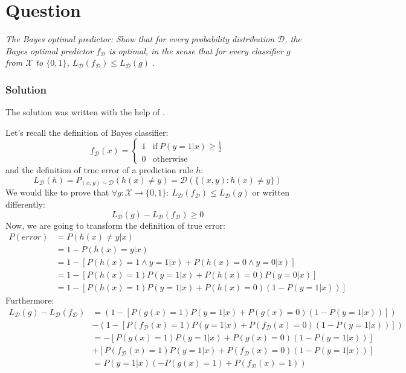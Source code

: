 \documentclass{article}
\newcounter{counterquestion}
\newenvironment{question}[1]
{
\stepcounter{counterquestion}
\section*{Question \thecounterquestion}
\textit{#1} 
} 
{
}
\newenvironment{solution}
{
\subsubsection*{Solution}
} 
{
}
\begin{document}
\begin{question}{The Bayes optimal predictor: Show that for every probability distribution $\mathcal{D}$, the Bayes optimal predictor $f_{\mathcal{D}}$ is optimal, in the sense that for every classifier $g$ from $\mathcal{X}$ to $\{0,1\}$, $L_{\mathcal{D}}(f_{\mathcal{D}}) \leq L_{\mathcal{D}}(g)$}.
\begin{solution}
The solution was written with the help of \cite{nowak}.

Let's recall the definition of Bayes classifier:
\[
f_{\mathcal{D}}(x) = 
\begin{cases}
1 & \text{if}\ P(y = 1 | x) \geq \frac{1}{2} \\
0 & \text{otherwise}
\end{cases}
\]
and the definition of true error of a prediction rule $h$:
\[
L_{\mathcal{D}}(h) = P_{(x, y) \sim \mathcal{D}}(h(x) \neq y) = \mathcal{D}(\{(x, y): h(x) \neq y\})
\]
We would like to prove that $\forall g: \mathcal{X} \to \{0, 1\}:\ L_{\mathcal{D}}(f_{\mathcal{D}}) \leq L_{\mathcal{D}}(g)$ or written differently:
\[
L_{\mathcal{D}}(g) - L_{\mathcal{D}}(f_{\mathcal{D}}) \geq 0
\]
Now, we are going to transform the definition of true error:
\begin{align*}
    P(error) & = P(h(x) \neq y | x) \\
    & = 1 - P(h(x) = y | x) \\
    & = 1 - [P(h(x) = 1 \wedge y = 1 | x) + P(h(x) = 0 \wedge y = 0 | x)] \\
    & = 1 - [P(h(x) = 1) P(y = 1 | x) + P(h(x) = 0) P(y = 0 | x)] \\
    & = 1 - [P(h(x) = 1) P(y = 1 | x) + P(h(x) = 0) (1 - P(y = 1 | x))]
\end{align*}
Furthermore:
\begin{align*}
    L_{\mathcal{D}}(g) - L_{\mathcal{D}}(f_{\mathcal{D}}) & = (1 - [P(g(x) = 1) P(y = 1 | x) + P(g(x) = 0) (1 - P(y = 1 | x))]) \\
    & - (1 - [P(f_\mathcal{D}(x) = 1) P(y = 1 | x) + P(f_\mathcal{D}(x) = 0) (1 - P(y = 1 | x))]) \\
    & = - [P(g(x) = 1) P(y = 1 | x) + P(g(x) = 0) (1 - P(y = 1 | x))] \\
    & + [P(f_\mathcal{D}(x) = 1) P(y = 1 | x) + P(f_\mathcal{D}(x) = 0) (1 - P(y = 1 | x))] \\
    & = P(y = 1 | x)(-P(g(x) = 1) + P(f_\mathcal{D}(x) = 1)) \\

\end{align*}
\end{solution}
\end{question}
\end{document}
